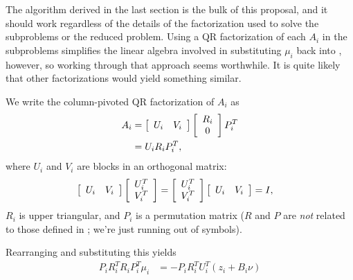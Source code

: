 The algorithm derived in the last section is the bulk of this proposal, and it should work regardless of the details of the factorization used to solve the subproblems or the reduced problem.
Using a QR factorization of each $A_i$ in the subproblems  simplifies the linear algebra involved in substituting $\mu_i$ back into , however, so working through that approach seems worthwhile.
It is quite likely that other factorizations would yield something similar.

We write the column-pivoted QR factorization of $A_i$ as
\begin{align}
    A_i &= \left[
        \begin{array}{ c c }
            U_i & V_i
        \end{array}
    \right]
    \left[
        \begin{array}{ c }
            R_i \\
            0
        \end{array}
    \right]
    P_i^T \\
    &= U_i R_i P_i^T ,
    \label{eq:vp_star_qr}
\end{align}
where $U_i$ and $V_i$ are blocks in an orthogonal matrix:
\begin{align}
    \left[
        \begin{array}{ c c }
            U_i & V_i
        \end{array}
    \right]
    \left[
        \begin{array}{ c }
            U_i^T \\
            V_i^T
        \end{array}
    \right]
    &=
    \left[
        \begin{array}{ c }
            U_i^T \\
            V_i^T
        \end{array}
    \right]
    \left[
        \begin{array}{ c c }
            U_i & V_i
        \end{array}
    \right]
    = I,
\end{align}
$R_i$ is upper triangular, and $P_i$ is a permutation matrix ($R$ and $P$ are \emph{not} related to those defined in ; we're just running out of symbols).

Rearranging  and substituting this yields
\begin{align}
    P_i R_i^T R_i P_i^T \mu_i &= -P_i R_i^T U_i^T \left(z_i + B_i\nu\right) \label{eq:vp_star_subproblem_qr_1}
\end{align}

